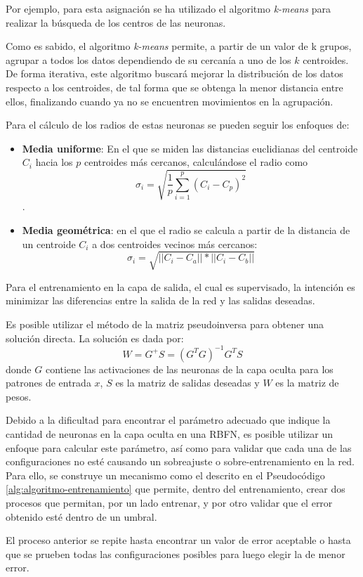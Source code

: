 \documentclass[journal]{IEEEtran}
\begin{document}
Por ejemplo, para esta asignación se ha utilizado el algoritmo \emph{k-means} para realizar la búsqueda de los centros de las neuronas.

Como es sabido, el algoritmo \emph{k-means} permite, a partir de un valor de k grupos, agrupar a todos los datos dependiendo de su cercanía a uno de los $k$ centroides.
De forma iterativa, este algoritmo buscará mejorar la distribución de los datos respecto a los centroides, de tal forma que se obtenga la menor distancia entre ellos, finalizando cuando ya no se encuentren movimientos en la agrupación.

Para el cálculo de los radios de estas neuronas se pueden seguir los enfoques de:
\begin{itemize}
	\item \textbf{Media uniforme}: En el que se miden las distancias euclidianas del centroide $C_i$ hacia los $p$ centroides más cercanos, calculándose el radio como $$\sigma _i = \sqrt{\frac{1}{p}\sum_{i=1}^p (C_i - C_p)^2}$$.
	\item \textbf{Media geométrica}: en el que el radio se calcula a partir de la distancia de un centroide $C_i$ a dos centroides vecinos más cercanos: $$\sigma _i = \sqrt{||C_i - C_a||*||C_i - C_b||}$$
\end{itemize}

Para el entrenamiento en la capa de salida, el cual es supervisado, la intención es minimizar las diferencias entre la salida de la red y las salidas deseadas.

Es posible utilizar el método de la matriz pseudoinversa para obtener una solución directa.
La solución es dada por:
$$
W = G^{+}S = (G^T G)^{-1}G^T S
$$
donde $G$ contiene las activaciones de las neuronas de la capa oculta para los patrones de entrada $x$, $S$ es la matriz de salidas deseadas y $W$ es la matriz de pesos.

Debido a la dificultad para encontrar el parámetro adecuado que indique la cantidad de neuronas en la capa oculta en una RBFN, es posible utilizar un enfoque para calcular este parámetro, así como para validar que cada una de las configuraciones no esté causando un sobreajuste o sobre-entrenamiento en la red.
Para ello, se construye un mecanismo como el descrito en el Pseudocódigo \ref{alg:algoritmo-entrenamiento} que permite, dentro del entrenamiento, crear dos procesos que permitan, por un lado entrenar, y por otro validar que el error obtenido esté dentro de un umbral.

El proceso anterior se repite hasta encontrar un valor de error aceptable o hasta que se prueben todas las configuraciones posibles para luego elegir la de menor error.
\end{document}
